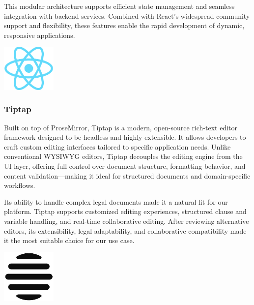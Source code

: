 This modular architecture supports efficient state management and seamless integration with backend services. Combined with React’s widespread community support and flexibility, these features enable the rapid development of dynamic, responsive applications.

\begin{center}
    \centering
    \includegraphics[width=0.2\textwidth]{Images/React Logo.png}
     \cite{react_logo}
    \label{fig:react_logo}
\end{center}

\subsubsection{Tiptap}
Built on top of ProseMirror, Tiptap is a modern, open-source rich-text editor framework designed to be headless and highly extensible. It allows developers to craft custom editing interfaces tailored to specific application needs. Unlike conventional WYSIWYG editors, Tiptap decouples the editing engine from the UI layer, offering full control over document structure, formatting behavior, and content validation—making it ideal for structured documents and domain-specific workflows.\mynewline

Its ability to handle complex legal documents made it a natural fit for our platform. Tiptap supports customized editing experiences, structured clause and variable handling, and real-time collaborative editing. After reviewing alternative editors, its extensibility, legal adaptability, and collaborative compatibility made it the most suitable choice for our use case.

\begin{center}
    \centering
    \includegraphics[width=0.2\textwidth]{Images/TipTap Logo.png}
     \cite{tiptap_logo}
    \label{fig:tiptap_logo}
\end{center}

